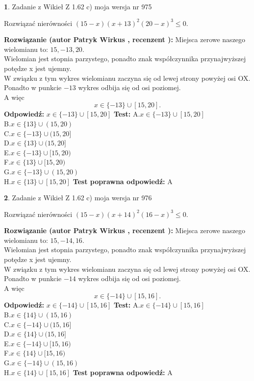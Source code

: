 \documentclass[12pt, a4paper]{article}
\theoremstyle{definition} %
\newtheorem{zad}{}
\newcommand{\zadStart}[1]{\begin{zad}#1\newline}
\newcommand{\zadStop}{\end{zad}}
\newcommand{\rozwStart}[2]{\noindent \textbf{Rozwiązanie (autor #1 , recenzent #2): }\newline}
\newcommand{\rozwStop}{\newline}
\newcommand{\odpStart}{\noindent \textbf{Odpowiedź:}\newline}
\newcommand{\odpStop}{\newline}
\newcommand{\testStart}{\noindent \textbf{Test:}\newline}
\newcommand{\testStop}{\newline}
\newcommand{\kluczStart}{\noindent \textbf{Test poprawna odpowiedź:}\newline}
\newcommand{\kluczStop}{\newline}
\begin{document}
\zadStart{Zadanie z Wikieł Z 1.62 c) moja wersja nr 975}

Rozwiązać nierówności $(15-x)(x+13)^{2}(20-x)^{3}\le0$.
\zadStop
\rozwStart{Patryk Wirkus}{}
Miejsca zerowe naszego wielomianu to: $15, -13, 20$.\\
Wielomian jest stopnia parzystego, ponadto znak współczynnika przy\linebreak najwyższej potędze x jest ujemny.\\ W związku z tym wykres wielomianu zaczyna się od lewej strony powyżej osi OX.\\
Ponadto w punkcie $-13$ wykres odbija się od osi poziomej.\\
A więc $$x \in \{-13\} \cup [15,20].$$
\rozwStop
\odpStart
$x \in \{-13\} \cup [15,20]$
\odpStop
\testStart
A.$x \in \{-13\} \cup [15,20]$\\
B.$x \in \{13\} \cup (15,20)$\\
C.$x \in \{-13\} \cup (15,20]$\\
D.$x \in \{13\} \cup (15,20]$\\
E.$x \in \{-13\} \cup [15,20)$\\
F.$x \in \{13\} \cup [15,20)$\\
G.$x \in \{-13\} \cup (15,20)$\\
H.$x \in \{13\} \cup [15,20]$
\testStop
\kluczStart
A
\kluczStop



\zadStart{Zadanie z Wikieł Z 1.62 c) moja wersja nr 976}

Rozwiązać nierówności $(15-x)(x+14)^{2}(16-x)^{3}\le0$.
\zadStop
\rozwStart{Patryk Wirkus}{}
Miejsca zerowe naszego wielomianu to: $15, -14, 16$.\\
Wielomian jest stopnia parzystego, ponadto znak współczynnika przy\linebreak najwyższej potędze x jest ujemny.\\ W związku z tym wykres wielomianu zaczyna się od lewej strony powyżej osi OX.\\
Ponadto w punkcie $-14$ wykres odbija się od osi poziomej.\\
A więc $$x \in \{-14\} \cup [15,16].$$
\rozwStop
\odpStart
$x \in \{-14\} \cup [15,16]$
\odpStop
\testStart
A.$x \in \{-14\} \cup [15,16]$\\
B.$x \in \{14\} \cup (15,16)$\\
C.$x \in \{-14\} \cup (15,16]$\\
D.$x \in \{14\} \cup (15,16]$\\
E.$x \in \{-14\} \cup [15,16)$\\
F.$x \in \{14\} \cup [15,16)$\\
G.$x \in \{-14\} \cup (15,16)$\\
H.$x \in \{14\} \cup [15,16]$
\testStop
\kluczStart
A
\kluczStop
\end{document}
